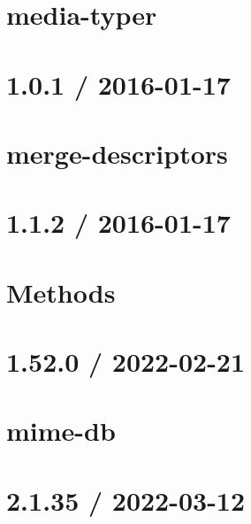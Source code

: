 \documentclass[twoside]{book}
\newcommand{\+}{\discretionary{\mbox{\scriptsize$\hookleftarrow$}}{}{}}
\begin{document}
\chapter{media-\/typer}
\label{md_src_nodejs_node_modules_media_typer_README}

\chapter{1.0.1 / 2016-\/01-\/17}
\label{md_src_nodejs_node_modules_merge_descriptors_HISTORY}

\chapter{merge-\/descriptors}
\label{md_src_nodejs_node_modules_merge_descriptors_README}

\chapter{1.1.2 / 2016-\/01-\/17}
\label{md_src_nodejs_node_modules_methods_HISTORY}

\chapter{Methods}
\label{md_src_nodejs_node_modules_methods_README}

\chapter{1.52.0 / 2022-\/02-\/21}
\label{md_src_nodejs_node_modules_mime_db_HISTORY}

\chapter{mime-\/db}
\label{md_src_nodejs_node_modules_mime_db_README}

\chapter{2.1.35 / 2022-\/03-\/12}
\label{md_src_nodejs_node_modules_mime_types_HISTORY}

\end{document}
